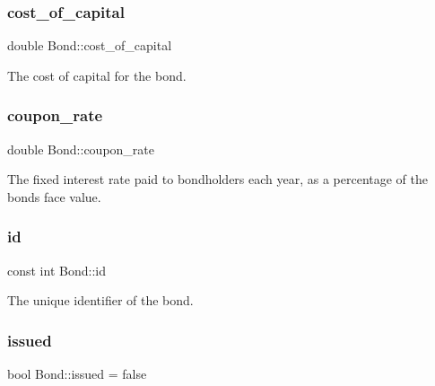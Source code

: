 \mbox{\label{classBond_ad98df7d28b398e620286f95ee085439b}} 
\subsubsection{\texorpdfstring{cost\+\_\+of\+\_\+capital}{cost\_of\_capital}}
{\footnotesize\ttfamily double Bond\+::cost\+\_\+of\+\_\+capital\hspace{0.3cm}{\ttfamily [protected]}}



The cost of capital for the bond. 

\mbox{\label{classBond_a5f66785534e24caa43d9f730130a6463}} 
\subsubsection{\texorpdfstring{coupon\+\_\+rate}{coupon\_rate}}
{\footnotesize\ttfamily double Bond\+::coupon\+\_\+rate\hspace{0.3cm}{\ttfamily [protected]}}



The fixed interest rate paid to bondholders each year, as a percentage of the bond\textquotesingle{}s face value. 

\mbox{\label{classBond_a7f75bcafbc16676ad6dbafbf40afae4a}} 
\subsubsection{\texorpdfstring{id}{id}}
{\footnotesize\ttfamily const int Bond\+::id}



The unique identifier of the bond. 

\mbox{\label{classBond_adafb5c5d73f072f7139891478a658a10}} 
\subsubsection{\texorpdfstring{issued}{issued}}
{\footnotesize\ttfamily bool Bond\+::issued = false\hspace{0.3cm}{\ttfamily [private]}}



